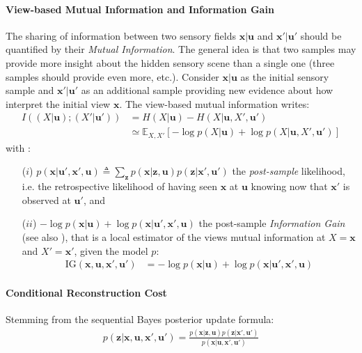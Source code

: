 \documentclass[12pt,twoside,openright]{article}
\begin{document}
\paragraph{View-based Mutual Information and Information Gain}
The sharing of information between two sensory fields $\boldsymbol{x}|\boldsymbol{u}$ and $\boldsymbol{x}'|\boldsymbol{u}'$  should be quantified by their \emph{Mutual Information}. The general idea is that two samples may provide more insight about the hidden sensory scene than a single one (three samples should provide even more, etc.). 
Consider $\boldsymbol{x}|\boldsymbol{u}$ as the initial sensory sample and $\boldsymbol{x}'|\boldsymbol{u}'$ as an additional sample providing new evidence about how interpret the initial view $\boldsymbol{x}$.
The view-based mutual information writes:
\begin{align}
	I((X| \boldsymbol{u}); (X'| \boldsymbol{u}')) &= H(X| \boldsymbol{u}) - H(X| \boldsymbol{u}, X', \boldsymbol{u}')\label{eq:mutual-info}\\
	&\simeq \mathbb{E}_{X,X'} \left[-\log p(X| \boldsymbol{u}) + \log p(X| \boldsymbol{u}, X', \boldsymbol{u}')\right] 
\end{align}
with :
\begin{itemize}
	\item[($i$)] $ p(\boldsymbol{x}| \boldsymbol{u}', \boldsymbol{x}', \boldsymbol{u}) \triangleq \sum_{\boldsymbol{z}} p(\boldsymbol{x}|\boldsymbol{z}, \boldsymbol{u}) p(\boldsymbol{z}|\boldsymbol{x}', \boldsymbol{u}')$ 
	the \emph{post-sample} likelihood, i.e. the retrospective likelihood of having seen $\boldsymbol{x}$ at $\boldsymbol{u}$ knowing now that $\boldsymbol{x}'$ is observed at $\boldsymbol{u}'$, and
	\item[($ii$)] 
	$-\log p(\boldsymbol{x}| \boldsymbol{u}) + \log p(\boldsymbol{x}| \boldsymbol{u}', \boldsymbol{x}', \boldsymbol{u})$ the post-sample
	\emph{Information Gain} (see also \citet{tishby2011information}), that is a local estimator of the views mutual information at $X = \boldsymbol{x}$ and $X' = \boldsymbol{x}'$, given the model $p$:
	\begin{align}
		\text{IG}(\boldsymbol{x},\boldsymbol{u}, \boldsymbol{x}', \boldsymbol{u}') 
		&= -\log p(\boldsymbol{x}| \boldsymbol{u}) + \log p(\boldsymbol{x}| \boldsymbol{u}', \boldsymbol{x}', \boldsymbol{u}) \label{eq:info-gain}
	\end{align}
\end{itemize}



\paragraph{Conditional Reconstruction Cost}
Stemming from the sequential Bayes posterior update formula:
	\begin{align} p(\boldsymbol{z}|\boldsymbol{x}, \boldsymbol{u}, \boldsymbol{x}', \boldsymbol{u}') = \frac{p(\boldsymbol{x}|\boldsymbol{z}, \boldsymbol{u})p(\boldsymbol{z}|\boldsymbol{x}', \boldsymbol{u}')}{p(\boldsymbol{x}|\boldsymbol{u},\boldsymbol{x}',\boldsymbol{u}')}
	\end{align} 
\end{document}
